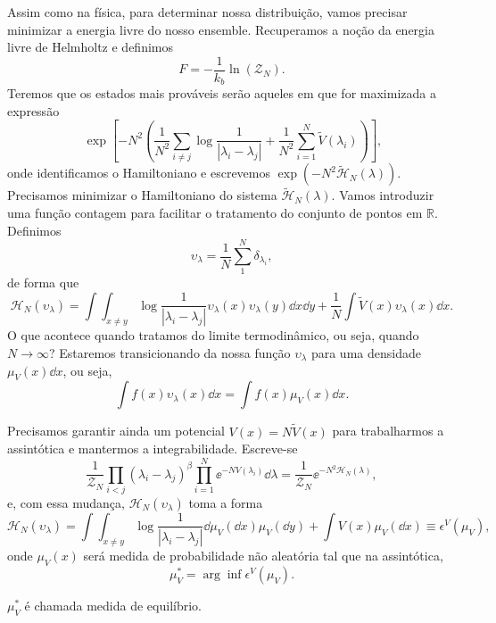 Assim como na física, para determinar nossa distribuição, vamos precisar minimizar a energia livre do nosso ensemble. Recuperamos a noção da energia livre de Helmholtz e definimos
\[
F = -\frac{1}{k_b} \ln{(\mathcal{Z}_N)}.
\]
Teremos que os estados mais prováveis serão aqueles em que for maximizada a expressão
\begin{equation}\
	\exp{\left[-N^2 \left( \frac{1}{N^2}\sum_{i\neq j}\log{\frac{1}{|\lambda_i - \lambda_j|}} + \frac{1}{N^2} \sum_{i=1}^{N} \tilde{V}(\lambda_i)  \right)\right]},
\end{equation}
onde identificamos o Hamiltoniano e escrevemos $\exp{(-N^2\mathcal{\tilde{H}}_N(\lambda))}$. Precisamos minimizar o Hamiltoniano do sistema $\mathcal{\tilde{H}}_N(\lambda)$. Vamos introduzir uma função contagem para facilitar o tratamento do conjunto de pontos em $\mathbb{R}$. Definimos
\begin{equation}
	\upsilon_\lambda = \frac{1}{N} \sum_1^N \delta_{\lambda_i},
\end{equation}
de forma que
\begin{equation}
	\mathcal{H}_N(\upsilon_\lambda) = 	\int \int_{x\neq y} \log{\frac{1}{|\lambda_i - \lambda_j|}}  \upsilon_\lambda(x) \upsilon_\lambda(y) \dd x \dd y + \frac{1}{N} \int \tilde{V}(x) \upsilon_\lambda(x) \dd x.
	\label{eq::CoulombGas:: hamilton}
\end{equation}
O que acontece quando tratamos do limite termodinâmico, ou seja, quando $N\to\infty$? Estaremos transicionando da nossa função $\upsilon_\lambda$ para uma densidade $\mu_V(x) \dd x$, ou seja,
\[
\int f(x) \upsilon_\lambda(x) \dd x =  \int f(x) \mu_V(x) \dd x.
\]

Precisamos garantir ainda um potencial $V(x) = 
N\tilde{V}(x)$ para trabalharmos a assintótica e mantermos a integrabilidade. Escreve-se
\[
\frac{1}{\mathcal{Z}_N} \prod_{i<j} (\lambda_i - \lambda_j)^\beta \prod_{i=1}^{N} \ee^{-NV(\lambda_i)} \dd\lambda = 	\frac{1}{\mathcal{Z}_N}  \ee^{-N^2 \mathcal{H}_N(\lambda)},
\]
e, com essa mudança, $\mathcal{H}_N(\upsilon_\lambda)$ toma a forma
\begin{equation}
	\mathcal{H}_N(\upsilon_\lambda) = \int \int_{x\neq y} \log{\frac{1}{|\lambda_i - \lambda_j|}}  \dd\mu_V(\dd x) \mu_V(\dd y) + \int V(x) \mu_V(\dd x) \equiv \epsilon^V(\mu_V),
\end{equation}
onde $\mu_V(x)$ será medida de probabilidade não aleatória tal que na assintótica,
\[
\mu_V^* = \arg \inf {\epsilon^V(\mu_V)}.
\]

$\mu_V^*$ é chamada medida de equilíbrio.
